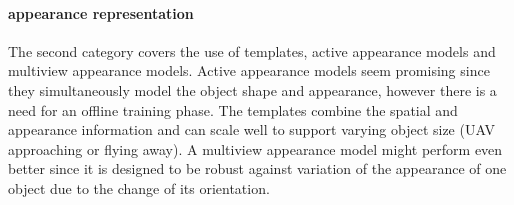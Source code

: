 \paragraph{appearance representation} 
The second category covers the use of templates, active appearance models and multiview appearance models. Active appearance models seem promising since they simultaneously model the object shape and appearance, however there is a need for an offline training phase. The templates combine the spatial and appearance information and can scale well to support varying object size (UAV approaching or flying away). A multiview appearance model might perform even better since it is designed to be robust against variation of the appearance of one object due to the change of its orientation.

%
%
%
%
